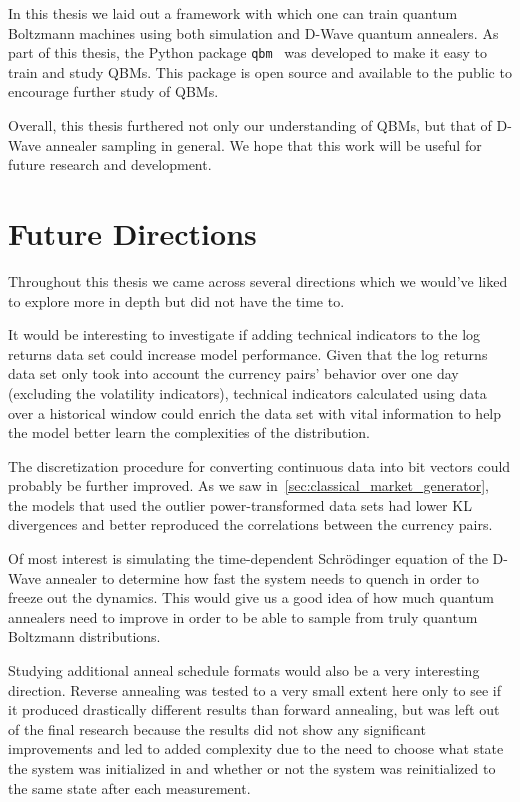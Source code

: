 In this thesis we laid out a framework with which one can train quantum Boltzmann machines using both simulation and D-Wave quantum annealers.
As part of this thesis, the Python package \texttt{qbm}~\cite{qbm} was developed to make it easy to train and study QBMs.
This package is open source and available to the public to encourage further study of QBMs.

Overall, this thesis furthered not only our understanding of QBMs, but that of D-Wave annealer sampling in general.
We hope that this work will be useful for future research and development.


\section{Future Directions}
Throughout this thesis we came across several directions which we would've liked to explore more in depth but did not have the time to.

It would be interesting to investigate if adding technical indicators to the log returns data set could increase model performance.
Given that the log returns data set only took into account the currency pairs' behavior over one day (excluding the volatility indicators), technical indicators calculated using data over a historical window could enrich the data set with vital information to help the model better learn the complexities of the distribution.

The discretization procedure for converting continuous data into bit vectors could probably be further improved.
As we saw in~\cref{sec:classical_market_generator}, the models that used the outlier power-transformed data sets had lower KL divergences and better reproduced the correlations between the currency pairs.

Of most interest is simulating the time-dependent Schr\"odinger equation of the D-Wave annealer to determine how fast the system needs to quench in order to freeze out the dynamics.
This would give us a good idea of how much quantum annealers need to improve in order to be able to sample from truly quantum Boltzmann distributions.

Studying additional anneal schedule formats would also be a very interesting direction.
Reverse annealing was tested to a very small extent here only to see if it produced drastically different results than forward annealing, but was left out of the final research because the results did not show any significant improvements and led to added complexity due to the need to choose what state the system was initialized in and whether or not the system was reinitialized to the same state after each measurement.
